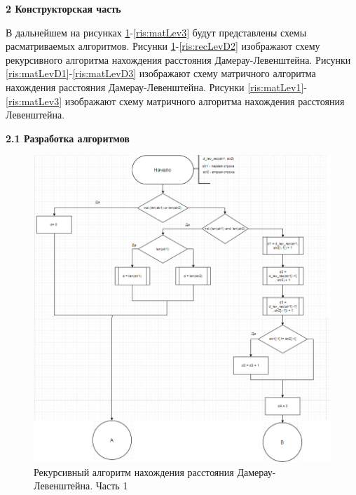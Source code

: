 \documentclass[a4paper,12pt]{report}
\begin{document}
    \newpage

    \begin{center}
        \textbf{2 Конструкторская часть}
        \label{sec:construct_part}
		\begin{flushleft}
			В дальнейшем на рисунках \ref{ris:recLevD1}-\ref{ris:matLev3}  будут представлены схемы расматриваемых алгоритмов.
			Рисунки \ref{ris:recLevD1}-\ref{ris:recLevD2} изображают схему рекурсивного алгоритма нахождения расстояния Дамерау-Левенштейна.
			Рисунки \ref{ris:matLevD1}-\ref{ris:matLevD3} изображают схему матричного алгоритма нахождения расстояния Дамерау-Левенштейна. 
			Рисунки \ref{ris:matLev1}-\ref{ris:matLev3} изображают схему матричного алгоритма нахождения расстояния Левенштейна.
		\end{flushleft}

        \textbf{2.1 Разработка алгоритмов}

		\begin{figure}[h!]
			\includegraphics[width=1\linewidth]{d_lev_rec2.jpg}
			\caption{Рекурсивный алгоритм нахождения расстояния Дамерау-Левенштейна. Часть 1}
			\label{ris:recLevD1}
		\end{figure}
	

\end{center}
\end{document}
